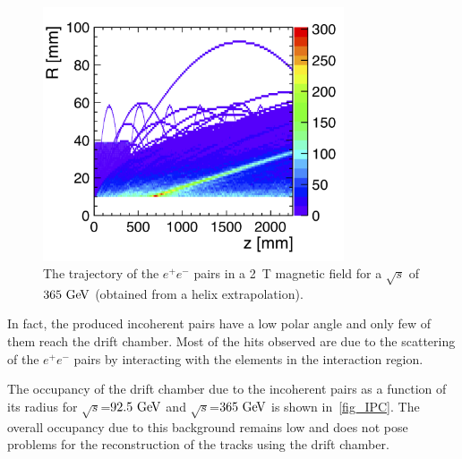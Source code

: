 \documentclass{article}
\begin{document}
\begin{figure}[!h]
\centering
\includegraphics[width=3.5in]{figures/pairs_R_Z.png}
\caption{The trajectory of the $e^+e^-$ pairs in a 2~T magnetic field for a $\sqrt{s}$ of $365\,\mathrm{\,Ge\kern -0.1em V}$ (obtained from a helix extrapolation).}
\label{fig_pairbcg}
\end{figure}

In fact, the produced incoherent pairs have a low polar angle and only few of them reach the drift chamber. Most of the hits observed are due to the scattering of the $e^+e^-$ pairs by interacting with the elements in the interaction region.


The occupancy of the drift chamber due to the incoherent pairs as a function of its radius for $\sqrt{s}$=$92.5\,\mathrm{\,Ge\kern -0.1em V}$ and $\sqrt{s}$=$365\,\mathrm{\,Ge\kern -0.1em V}$ is shown in~\cref{fig_IPC}. The overall occupancy due to this background remains low and does not pose problems for the reconstruction of the tracks using the drift chamber.
\end{document}
